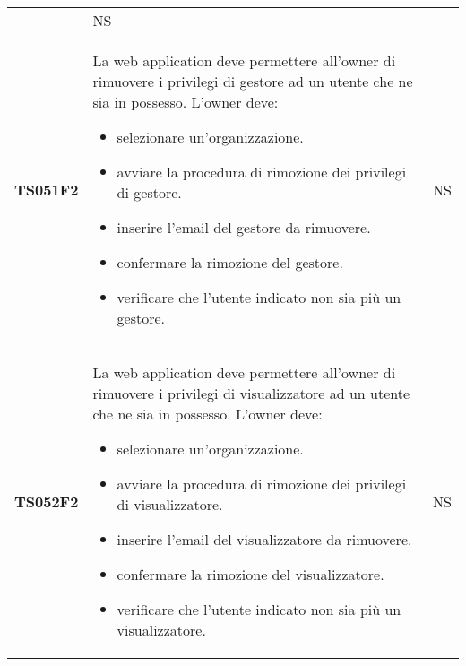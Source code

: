 \documentclass[../piano-di-qualifica.tex]{subfiles}
\begin{document}
\begin{centering}
\begin{longtable}[H]{>{\centering\bfseries}m{3cm} >{}p{10cm} >{\centering\arraybackslash}m{3cm}}
\begin{itemize}
    \end{itemize}
                       & NS                                                                                                                                                                                                                                                               \\
    TS051F2            & La web application deve permettere all'owner di rimuovere i privilegi di gestore ad un utente che ne sia in possesso. \newline
    L'owner deve:
    \begin{itemize}
      \item selezionare un'organizzazione.
      \item avviare la procedura di rimozione dei privilegi di gestore.
      \item inserire l'email del gestore da rimuovere.
      \item confermare la rimozione del gestore.
      \item verificare che l'utente indicato non sia più un gestore.
    \end{itemize}
                       & NS                                                                                                                                                                                                                                                               \\
    TS052F2            & La web application deve permettere all'owner di rimuovere i privilegi di visualizzatore ad un utente che ne sia in possesso. \newline
    L'owner deve:
    \begin{itemize}
      \item selezionare un'organizzazione.
      \item avviare la procedura di rimozione dei privilegi di visualizzatore.
      \item inserire l'email del visualizzatore da rimuovere.
      \item confermare la rimozione del visualizzatore.
      \item verificare che l'utente indicato non sia più un visualizzatore.
    \end{itemize}
                       & NS                                                                                                                                                                                                                                                               \\

\end{longtable}
\end{centering}
\end{document}
